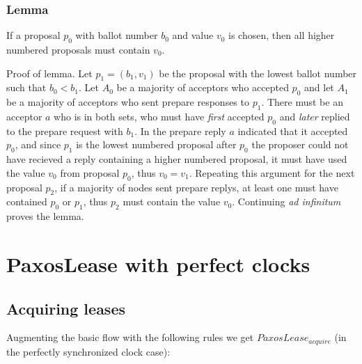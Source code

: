 \documentclass[12pt]{amsart}
\begin{document}
\subsubsection{ Lemma } If a proposal $p_0$ with ballot number $b_0$ and value $v_0$ is chosen, then all higher numbered proposals must contain $v_0$.

Proof of lemma. Let $p_1 = (b_1, v_1)$ be the proposal with the lowest ballot number such that $b_0 < b_1$. Let $A_0$ be a majority of acceptors who accepted $p_0$ and let $A_1$ be a majority of acceptors who sent prepare responses to $p_1$. There must be an acceptor $a$ who is in both sets, who must have \emph{first} accepted $p_0$ and \emph{later} replied to the prepare request with $b_1$. In the prepare reply $a$ indicated that it accepted $p_0$, and since $p_1$ is the lowest numbered proposal after $p_0$ the proposer could not have recieved a reply containing a higher numbered proposal, it must have used the value $v_0$ from proposal $p_0$, thus $v_0 = v_1$. Repeating this argument for the next proposal $p_2$, if a majority of nodes sent prepare replys, at least one must have contained $p_0$ or $p_1$, thus $p_2$ must contain the value $v_0$. Continuing \emph{ad infinitum} proves the lemma.

\section{ PaxosLease with perfect clocks}

\subsection{ Acquiring leases }

Augmenting the basic flow with the following rules we get $PaxosLease_{acquire}$ (in the perfectly synchronized clock case):
\end{document}
